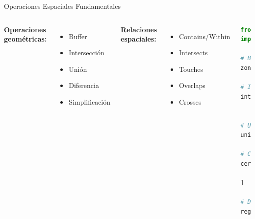 \documentclass[10pt,aspectratio=169]{beamer}
\begin{document}
\begin{frame}[fragile]{Operaciones Espaciales Fundamentales}
    \begin{columns}[T]
        \footnotesize
        \textbf{Operaciones geométricas:}
        \begin{itemize}
            \item Buffer
            \item Intersección
            \item Unión
            \item Diferencia
            \item Simplificación
        \end{itemize}
        
        \textbf{Relaciones espaciales:}
        \begin{itemize}
            \item Contains/Within
            \item Intersects
            \item Touches
            \item Overlaps
            \item Crosses
        \end{itemize}
        
        \begin{lstlisting}[language=Python]
from shapely.ops import unary_union
import geopandas as gpd

# Buffer
zonas_influencia = gdf.buffer(100)

# Interseccion
intersec = gdf1.overlay(gdf2, 
                       how='intersection')

# Union de geometrias
union_total = unary_union(gdf.geometry)

# Consultas espaciales
cerca_metro = puntos[
    puntos.distance(estacion) < 500
]

# Dissolve por atributo
regiones = comunas.dissolve(by='REGION')
        \end{lstlisting}
    \end{columns}
\end{frame}
\end{document}

